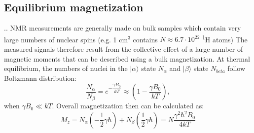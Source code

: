 \documentclass{beamer}
\begin{document}
\subsection{Equilibrium magnetization}
\begin{frame}{\thesection.\thesubsection. \insertsubsection}
  NMR measurements are generally made on bulk samples which contain very large numbers of nuclear spins (e.g. 1 cm$^3$ contains $N \approx 6.7 \cdot 10^{22}$ \textsuperscript{1}H atoms)
  The measured signals therefore result from the collective effect of a large number of magnetic moments that can be described using a bulk magnetization.
  At thermal equilibrium, the numbers of nuclei in the $\vert \alpha \rangle$ state $N_{\alpha}$ and  $\vert \beta \rangle$ state $N_{beta}$ follow Boltzmann distribution:
  \begin{equation}
    \dfrac{N_{\alpha}}{N_{\beta}} = e^{-\dfrac{\gamma B_0}{kT}} \approx (1 - \dfrac{\gamma B_0}{kT}),
  \end{equation} 
  when $\gamma B_0 \ll kT$. Overall magnetization then can be calculated as:
  \begin{equation}
    M_z = N_{\alpha}(-\dfrac{1}{2}\gamma \hbar) + N_{\beta}(\dfrac{1}{2}\gamma \hbar) = N \dfrac{\gamma^2 \hbar^2 B_0}{4kT} 
  \end{equation}
\end{frame}
\end{document}
